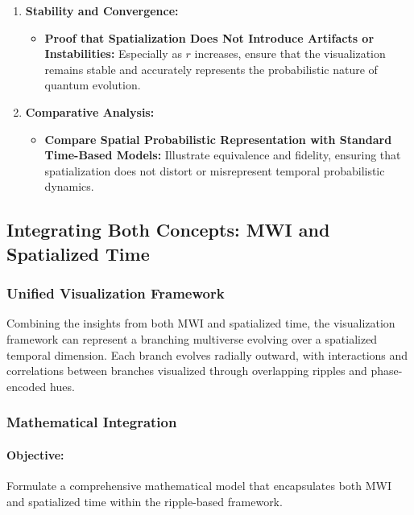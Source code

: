\documentclass[12pt]{article}
\begin{document}
\begin{enumerate}
    \item \textbf{Stability and Convergence:}
    \begin{itemize}
        \item \textbf{Proof that Spatialization Does Not Introduce Artifacts or Instabilities:}
        Especially as \(r\) increases, ensure that the visualization remains stable and accurately represents the probabilistic nature of quantum evolution.
    \end{itemize}
    
    \item \textbf{Comparative Analysis:}
    \begin{itemize}
        \item \textbf{Compare Spatial Probabilistic Representation with Standard Time-Based Models:}
        Illustrate equivalence and fidelity, ensuring that spatialization does not distort or misrepresent temporal probabilistic dynamics.
    \end{itemize}
\end{enumerate}

\subsection{Integrating Both Concepts: MWI and Spatialized Time}
\subsubsection{Unified Visualization Framework}
Combining the insights from both MWI and spatialized time, the visualization framework can represent a branching multiverse evolving over a spatialized temporal dimension. Each branch evolves radially outward, with interactions and correlations between branches visualized through overlapping ripples and phase-encoded hues.

\subsubsection{Mathematical Integration}
\paragraph{Objective:} Formulate a comprehensive mathematical model that encapsulates both MWI and spatialized time within the ripple-based framework.
\end{document}
